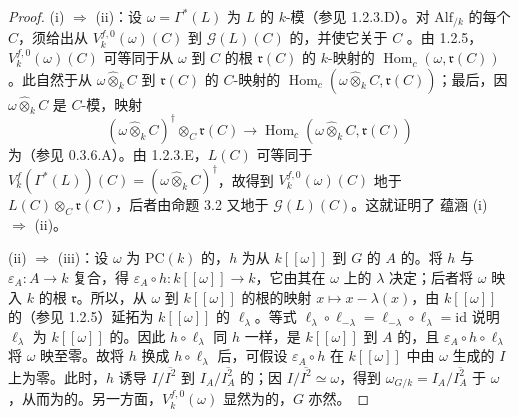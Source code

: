 \begin{proof}
(i) $\Rightarrow$ (ii)：设 $\omega=\Gamma^*(L)$ 为 $L$ 的 $k$-模（参见 1.2.3.D）。对 $\mathrm{Alf}_{/k}$ 的每个 $C$，须给出从 $V_k^{f,0}(\omega)(C)$ 到 $\mathscr G(L)(C)$ 的，并使它关于 $C$ 。由 1.2.5，$V_k^{f,0}(\omega)(C)$ 可等同于从 $\omega$ 到 $C$ 的根 $\mathfrak r(C)$ 的 $k$-映射的 $\operatorname{Hom}_c(\omega,\mathfrak r(C))$。此自然于从 $\omega\widehat\otimes_k C$ 到 $\mathfrak r(C)$ 的 $C$-映射的 $\operatorname{Hom}_c(\omega\widehat\otimes_k C,\mathfrak r(C))$；最后，因 $\omega\widehat\otimes_k C$ 是 $C$-模，映射
\[
(\omega\widehat\otimes_k C)^\dagger\otimes_C\mathfrak r(C)\longrightarrow\operatorname{Hom}_c(\omega\widehat\otimes_k C,\mathfrak r(C))
\]
为（参见 0.3.6.A）。由 1.2.3.E，$L(C)$ 可等同于 $V_k^f(\Gamma^*(L))(C)=(\omega\widehat\otimes_k C)^\dagger$，故得到 $V_k^{f,0}(\omega)(C)$ 地于 $L(C)\otimes_C\mathfrak r(C)$，后者由命题 3.2 又地于 $\mathscr G(L)(C)$。这就证明了
蕴涵 (i) $\Rightarrow$ (ii)。

(ii) $\Rightarrow$ (iii)：设 $\omega$ 为 $\mathrm{PC}(k)$ 的，$h$ 为从 $k[[\omega]]$ 到 $G$ 的 $A$ 的。将 $h$ 与 $\varepsilon_A:A\to k$ 复合，得 $\varepsilon_A\circ h:k[[\omega]]\to k$，它由其在 $\omega$ 上的 $\lambda$ 决定；后者将 $\omega$ 映入 $k$ 的根 $\mathfrak r$。所以，从 $\omega$ 到 $k[[\omega]]$ 的根的映射 $x\mapsto x-\lambda(x)$，由 $k[[\omega]]$ 的（参见 1.2.5）延拓为 $k[[\omega]]$ 的 $\ell_\lambda$。等式 $\ell_\lambda\circ\ell_{-\lambda}=\ell_{-\lambda}\circ\ell_\lambda=\mathrm{id}$ 说明 $\ell_\lambda$ 为 $k[[\omega]]$ 的。因此 $h\circ\ell_\lambda$ 同 $h$ 一样，是 $k[[\omega]]$ 到 $A$ 的，且 $\varepsilon_A\circ h\circ\ell_\lambda$ 将 $\omega$ 映至零。故将 $h$ 换成 $h\circ\ell_\lambda$ 后，可假设 $\varepsilon_A\circ h$ 在 $k[[\omega]]$ 中由 $\omega$ 生成的 $I$ 上为零。此时，$h$ 诱导 $I/\overline{I^2}$ 到 $I_A/\overline{I_A^2}$ 的；因 $I/\overline{I^2}\simeq\omega$，得到 $\omega_{G/k}=I_A/\overline{I_A^2}$ 于 $\omega$，从而为的。另一方面，$V_k^{f,0}(\omega)$ 显然为的，$G$ 亦然。


\end{proof}
